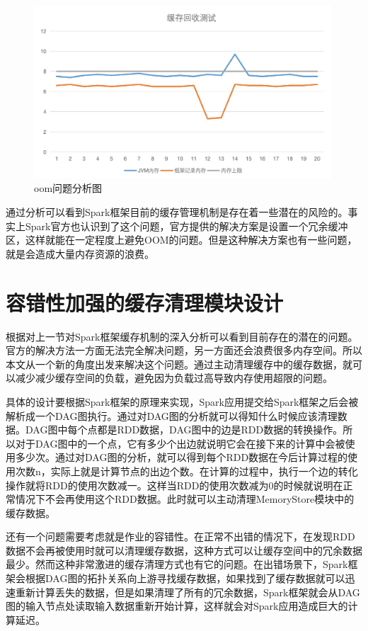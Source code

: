 \begin{figure}[htbp]
    \centering
    \includegraphics[width=0.99\textwidth]{Img/oom.png}
    \caption{oom问题分析图}
    \label{fig:oom}
\end{figure}


通过分析可以看到Spark框架目前的缓存管理机制是存在着一些潜在的风险的。事实上Spark官方也认识到了这个问题，官方提供的解决方案是设置一个冗余缓冲区，这样就能在一定程度上避免OOM的问题。但是这种解决方案也有一些问题，就是会造成大量内存资源的浪费。

\section{容错性加强的缓存清理模块设计}

根据对上一节对Spark框架缓存机制的深入分析可以看到目前存在的潜在的问题。官方的解决方法一方面无法完全解决问题，另一方面还会浪费很多内存空间。所以本文从一个新的角度出发来解决这个问题。通过主动清理缓存中的缓存数据，就可以减少减少缓存空间的负载，避免因为负载过高导致内存使用超限的问题。

具体的设计要根据Spark框架的原理来实现，Spark应用提交给Spark框架之后会被解析成一个DAG图执行。通过对DAG图的分析就可以得知什么时候应该清理数据。DAG图中每个点都是RDD数据，DAG图中的边是RDD数据的转换操作。所以对于DAG图中的一个点，它有多少个出边就说明它会在接下来的计算中会被使用多少次。通过对DAG图的分析，就可以得到每个RDD数据在今后计算过程的使用次数n，实际上就是计算节点的出边个数。在计算的过程中，执行一个边的转化操作就将RDD的使用次数减一。这样当RDD的使用次数减为0的时候就说明在正常情况下不会再使用这个RDD数据。此时就可以主动清理MemoryStore模块中的缓存数据。

还有一个问题需要考虑就是作业的容错性。在正常不出错的情况下，在发现RDD数据不会再被使用时就可以清理缓存数据，这种方式可以让缓存空间中的冗余数据最少。然而这种非常激进的缓存清理方式也有它的问题。在出错场景下，Spark框架会根据DAG图的拓扑关系向上游寻找缓存数据，如果找到了缓存数据就可以迅速重新计算丢失的数据，但是如果清理了所有的冗余数据，Spark框架就会从DAG图的输入节点处读取输入数据重新开始计算，这样就会对Spark应用造成巨大的计算延迟。

